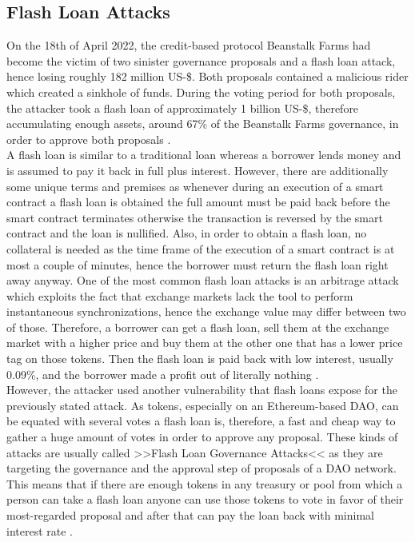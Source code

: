 \documentclass[a4paper,12pt]{report}
\begin{document}
	    \subsection{Flash Loan Attacks}
	    \startsubsection
	         On the 18th of April 2022, the credit-based protocol Beanstalk Farms had become the victim of two sinister governance proposals and a flash loan attack, hence losing roughly 182 million US-\$. Both proposals contained a malicious rider which created a sinkhole of funds. During the voting period for both proposals, the attacker took a flash loan of approximately 1 billion US-\$, therefore accumulating enough assets, around 67\% of the Beanstalk Farms governance, in order to approve both proposals \parencite{BeanstalkFarmsFlashLoanAttack}. \\
	         A flash loan is similar to a traditional loan whereas a borrower lends money and is assumed to pay it back in full plus interest. However, there are additionally some unique terms and premises as whenever during an execution of a smart contract a flash loan is obtained the full amount must be paid back before the smart contract terminates otherwise the transaction is reversed by the smart contract and the loan is nullified. Also, in order to obtain a flash loan, no collateral is needed as the time frame of the execution of a smart contract is at most a couple of minutes, hence the borrower must return the flash loan right away anyway. One of the most common flash loan attacks is an arbitrage attack which exploits the fact that exchange markets lack the tool to perform instantaneous synchronizations, hence the exchange value may differ between two of those. Therefore, a borrower can get a flash loan, sell them at the exchange market with a higher price and buy them at the other one that has a lower price tag on those tokens. Then the flash loan is paid back with low interest, usually 0.09\%, and the borrower made a profit out of literally nothing \parencite{FlashLoan}. \\
	         However, the attacker used another vulnerability that flash loans expose for the previously stated attack. As tokens, especially on an Ethereum-based DAO, can be equated with several votes a flash loan is, therefore, a fast and cheap way to gather a huge amount of votes in order to approve any proposal. These kinds of attacks are usually called >>Flash Loan Governance Attacks<< as they are targeting the governance and the approval step of proposals of a DAO network. This means that if there are enough tokens in any treasury or pool from which a person can take a flash loan anyone can use those tokens to vote in favor of their most-regarded proposal and after that can pay the loan back with minimal interest rate \parencite{FlashLoanGovernanceAttacks}.
	    \closesection
\end{document}
